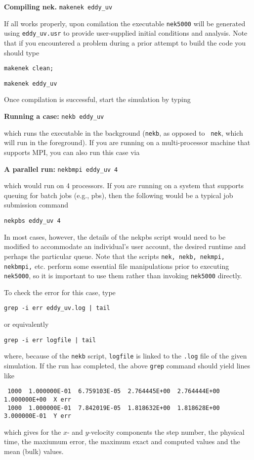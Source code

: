 {\bf Compiling nek.}
{\tt makenek eddy\_uv} 

\noindent
If all works properly, upon comilation the executable {\tt nek5000} will be generated using {\tt eddy\_uv.usr} to provide
user-supplied initial conditions and analysis.  Note that if you encountered
a problem during a prior attempt to build the code you should type

{\tt makenek clean;}  

{\tt makenek eddy\_uv} 

\noindent
Once compilation is successful, start the simulation by typing
 

{\bf Running a case:}
{\tt nekb eddy\_uv } 

which runs the executable in the background ({\tt nekb}, as opposed to {\tt
nek}, which will run in the foreground).  
If you are running on a multi-processor machine that supports MPI, you
can also run this case via

{\bf A parallel run:}
{\tt nekbmpi eddy\_uv 4}

\noindent
which would run on 4 processors.    If you are running on a system
that supports queuing for batch jobs (e.g., pbs), then the following
would be a typical job submission command

{\tt nekpbs eddy\_uv 4}

In most cases, however, the details of the nekpbs script would need
to be modified to accommodate an individual's user account, the 
desired runtime and perhaps the particular queue.   Note that the
scripts {\tt nek, nekb, nekmpi, nekbmpi,} etc. perform some essential
file manipulations prior to executing {\tt nek5000}, so it is important
to use them rather than invoking {\tt nek5000} directly.


To check the error for this case, type
\begin{verbatim}
grep -i err eddy_uv.log | tail
\end{verbatim}
or equivalently
\begin{verbatim}
grep -i err logfile | tail
\end{verbatim}
where, because of the {\tt nekb} script, {\tt logfile} is 
linked to the {\tt .log} file of the given simulation. 
If the run has completed, the above {\tt grep} command should yield lines like
\scriptsize
\begin{verbatim}
 1000  1.000000E-01  6.759103E-05  2.764445E+00  2.764444E+00  1.000000E+00  X err
 1000  1.000000E-01  7.842019E-05  1.818632E+00  1.818628E+00  3.000000E-01  Y err
\end{verbatim}
\normalsize
which gives for the $x$- and $y$-velocity components the 
step number, the physical time, the maxiumum error, the maximum exact
and computed values and the mean (bulk) values.

